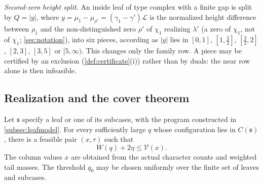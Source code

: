 \documentclass[11pt]{amsart}
\numberwithin{equation}{section}
\theoremstyle{plain}
\theoremstyle{definition}
\theoremstyle{remark}
\newcommand{\LL}{\mathcal{L}}
\newcommand{\1}{\mathbf{1}}
\newcommand{\bchi}{\overline{\chi}}
\begin{document}
\emph{Second-zero height split.} An inside leaf of type $\mathrm{complex}$ with a finite gap is
split by $Q=|y|$, where $y=\mu_1-\mu_{\rho'}=(\gamma_1-\gamma')\LL$ is the normalized height difference between
$\rho_1$ and the non-distinguished zero $\rho'$ of $\chi_1$ realizing $\lambda'$ (a zero of $\chi_1$, not of $\bchi_1$;
\cref{sec:notation}), into six pieces, according as $|y|$ lies in $[0,1]$, $[1,\frac32]$, $[\frac32,2]$, $[2,3]$,
$[3,5]$ or $[5,\infty)$. This changes only the family row. A piece may be certified by an exclusion (\cref{def:certificate}(i)) rather than by
duals: the near row alone is then infeasible.

\subsection{Realization and the cover theorem}\label{subsec:realization}

\begin{proposition}[Realization]\label{prop:realization}
Let $\mathfrak s$ specify a leaf or one of its subcases, with the program constructed
in \cref{subsec:leafmodel}. For every sufficiently large $q$ whose configuration lies
in $C(\mathfrak s)$, there is a feasible pair $(x,\tau)$ such that
\[
  W(q)+2\eta\le\mathcal V(x).
\]
The column values $x$ are obtained from the actual character counts and weighted tail
masses. The threshold $q_0$ may be chosen uniformly over the finite set of leaves and
subcases.
\end{proposition}
\end{document}

